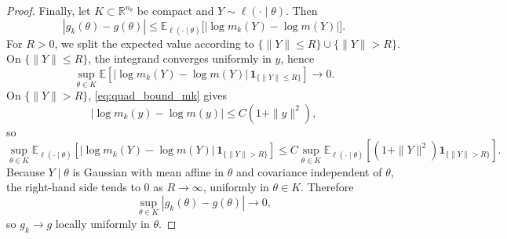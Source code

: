 \documentclass[a4paper,11pt]{article}
\newcommand{\E}{\mathbb{E}}
\begin{document}
\begin{proof}
Finally, let \(K\subset\mathbb R^{n_\theta}\) be compact and \(Y\sim \ell(\cdot\mid\theta)\). Then
\[
|g_k(\theta)-g(\theta)|
\le
\E_{\ell(\cdot\mid\theta)}
\bigl[|\log m_k(Y)-\log m(Y)|\bigr].
\]
For \(R>0\), we split the expected value according to \(\{\|Y\|\le R\}\cup\{\|Y\|>R\}\). On \(\{\|Y\|\le R\}\), the integrand converges uniformly in \(y\), hence
\[
\sup_{\theta\in K}
\E\!\left[
|\log m_k(Y)-\log m(Y)|\,\mathbf 1_{\{\|Y\|\le R\}}
\right]\to 0.
\]
On \(\{\|Y\|>R\}\), \eqref{eq:quad_bound_mk} gives
\[
|\log m_k(y)-\log m(y)|\le C(1+\|y\|^2),
\]
so
\[
\sup_{\theta\in K}
\E_{\ell(\cdot\mid\theta)}
\!\left[
|\log m_k(Y)-\log m(Y)|\,\mathbf 1_{\{\|Y\|>R\}}
\right]
\le
C\sup_{\theta\in K}
\E_{\ell(\cdot\mid\theta)}
\!\left[(1+\|Y\|^2)\mathbf 1_{\{\|Y\|>R\}}\right].
\]
Because \(Y\mid\theta\) is Gaussian with mean affine in \(\theta\) and covariance independent of \(\theta\), the right-hand side tends to \(0\) as \(R\to\infty\), uniformly in \(\theta\in K\). Therefore
\[
\sup_{\theta\in K}|g_k(\theta)-g(\theta)|\to0,
\]
so \(g_k\to g\) locally uniformly in \(\theta\).
\end{proof}

\printbibliography


%
%
\end{document}
